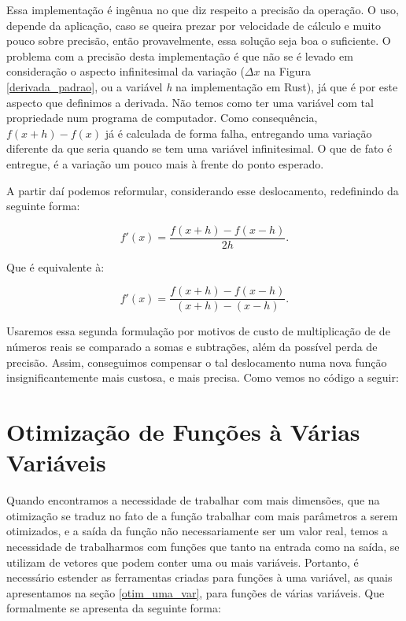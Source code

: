 Essa implementação é ingênua no que diz respeito a precisão da operação. O
uso, depende da aplicação, caso se queira prezar por velocidade de cálculo e
muito pouco sobre precisão, então provavelmente, essa solução seja boa o
suficiente. O problema com a precisão desta implementação é que não se é
levado em consideração o aspecto infinitesimal da variação (\(\Delta x\) na
Figura \ref{derivada_padrao}, ou a variável \textit{h} na implementação
em Rust), já que é por este aspecto que definimos a derivada. Não temos como ter
uma variável com tal propriedade num programa de computador. Como consequência,
\(f(x + h) - f(x)\) já é calculada de forma falha, entregando uma variação
diferente da que seria quando se tem uma variável infinitesimal. O que de fato
é entregue, é a variação um pouco mais à frente do ponto esperado.

A partir daí podemos reformular, considerando esse deslocamento, redefinindo
da seguinte forma:


\begin{equation}
    f'(x) = \frac{f(x + h) - f(x - h)}{2h}.
\end{equation}

Que é equivalente à:

\begin{equation}
    f'(x) = \frac{f(x + h) - f(x - h)}{(x + h) - (x - h)}.
\end{equation}


Usaremos essa segunda formulação por motivos de custo de multiplicação de de
números reais se comparado a somas e subtrações, além da possível perda de
precisão. Assim, conseguimos compensar o tal deslocamento numa nova função
insignificantemente mais custosa, e mais precisa. Como vemos no código a seguir:




\section{{Otimização de Funções à Várias Variáveis}}

\hspace{0.8cm}
Quando encontramos a necessidade de trabalhar com mais dimensões, que na
otimização se traduz no fato de a função trabalhar com mais parâmetros a serem
otimizados, e a saída da função não necessariamente ser um valor real,
temos a necessidade de trabalharmos com funções que tanto na entrada como na
saída, se utilizam de vetores que podem conter uma ou mais variáveis. Portanto,
é necessário estender as ferramentas criadas para funções à uma variável, as
quais apresentamos na seção \ref{otim_uma_var}, para funções de várias
variáveis. Que formalmente se apresenta da seguinte forma:

